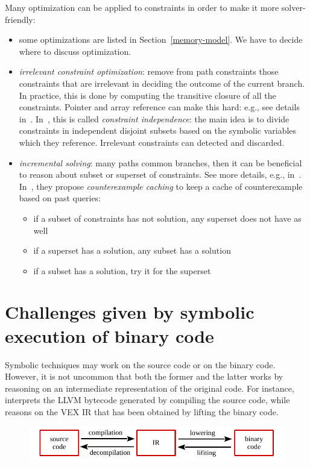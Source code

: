 Many optimization can be applied to constraints in order to make it more solver-friendly:
\begin{itemize}

  \item some optimizations are listed in Section~\ref{memory-model}. We have to decide where to discuss optimization.

  \item {\em irrelevant constraint optimization}: remove from path constraints those constraints that are irrelevant in deciding the outcome of the current branch. In practice, this is done by computing the transitive closure of all the constraints. Pointer and array reference can make this hard: e.g., see details in~\cite{EXE-CCS06,EGL-ISSTA09,CUTE-FSE13}. In~\cite{KLEE-OSDI08}, this is called {\em constraint independence}: the main idea is to divide constraints in independent disjoint subsets based on the symbolic variables which they reference. Irrelevant constraints can detected and discarded.

  \item {\em incremental solving}: many paths common branches, then it can be beneficial to reason about subset or superset of constraints. See more details, e.g., in~\cite{KLEE-OSDI08,CUTE-FSE13}. In~\cite{KLEE-OSDI08}, they propose {\em counterexample caching} to keep a cache of counterexample based on past queries:
      \begin{itemize}
        \item if a subset of constraints has not solution, any superset does not have as well
        \item if a superset has a solution, any subset has a solution
        \item if a subset has a solution, try it for the superset
      \end{itemize}

\end{itemize}


\section{Challenges given by symbolic execution of binary code}

Symbolic techniques may work on the source code or on the binary code. However, it is not uncommon that both the former and the latter works by reasoning on an intermediate representation of the original code. For instance, ~\cite{KLEE-OSDI08} interprets the LLVM bytecode generated by compiling the source code, while~\cite{ANGR-SP16} reasons on the VEX IR that has been obtained by lifting the binary code.

\begin{figure}[h!]
  \centering
  \includegraphics[width=.7\columnwidth]{images/compiler} 
\end{figure}


